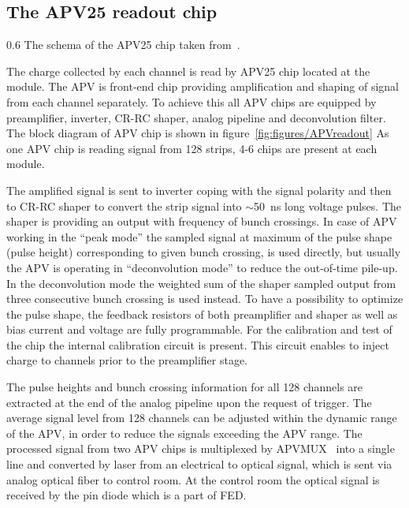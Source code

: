 

\subsection{The APV25 readout chip \label{sec:APV}}


                 {0.6}       %
                 {The schema of the APV25 chip taken from~\cite{Friedl:2001kra}.} %

The charge collected by each channel is read by APV25 chip located at the module. The APV is front-end chip providing amplification and shaping of signal from each channel separately. To achieve this all APV chips are equipped by preamplifier, inverter, CR-RC shaper, analog pipeline and deconvolution filter. The block diagram of APV chip is shown in figure~\ref{fig:figures/APVreadout} As one APV chip is reading signal from 128 strips, 4-6 chips are present at each module.

The amplified signal is sent to inverter coping with the signal polarity and then to CR-RC shaper to convert the strip signal into $\sim$50~ns long voltage pulses. The shaper is providing an output with frequency of bunch crossings. In case of APV working in the ``peak mode'' the sampled signal at maximum of the pulse shape (pulse height) corresponding to given bunch crossing, is used directly, but usually the APV is operating in ``deconvolution mode'' to reduce the out-of-time pile-up. In the deconvolution mode the weighted sum of the shaper sampled output from three consecutive bunch crossing is used instead. To have a possibility to optimize the pulse shape, the feedback resistors of both preamplifier and shaper as well as  bias current and voltage are fully programmable. For the calibration and test of the chip the internal calibration circuit is present. This circuit enables to inject charge to channels prior to the preamplifier stage.

The pulse heights and bunch crossing information for all 128 channels are extracted at the end of the analog pipeline upon the request of trigger. The average signal level from 128 channels can be adjusted within the dynamic range of the APV, in order to reduce the signals exceeding the APV range. The processed signal from two APV chips is multiplexed by APVMUX~\cite{Ball:2007zza} into a single line and converted by laser from an electrical to optical signal, which is sent via analog optical fiber to control room. At the control room the optical signal is received by the pin diode which is a part of FED.

